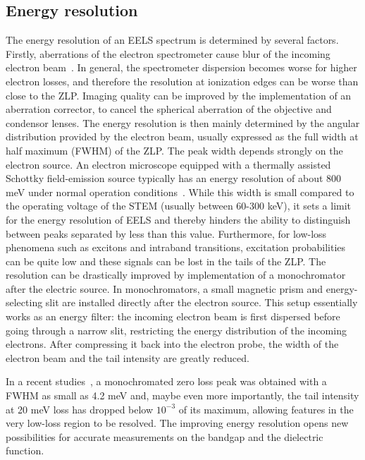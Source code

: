 \subsection{Energy resolution}
The energy resolution of an EELS spectrum is determined by several factors. 
%
Firstly, aberrations of the electron spectrometer cause blur of the incoming 
electron beam~\cite{Tiemeijer}. 
%
In general, the spectrometer dispersion becomes worse for higher electron losses,
and therefore the resolution at ionization edges can be worse than close to the
ZLP.
%
Imaging quality can be improved by the implementation of an aberration corrector, 
to cancel the spherical aberration of the objective and condensor lenses. 
%
The energy resolution is then mainly determined by the angular distribution 
provided by the electron beam, usually expressed as the full width at half maximum (FWHM) of the ZLP. 
%
The peak width depends strongly on the electron source. 
An  electron  microscope  equipped  with  a  thermally  assisted  
Schottky  field-emission source typically has an energy resolution of about 800 meV 
under normal operation conditions~\cite{gu}.  
%
While this width is small compared to the operating voltage of the STEM (usually between 60-300 keV), 
it sets a limit for the energy resolution of EELS and thereby hinders the ability to distinguish 
between peaks separated by less than this value. 
%
Furthermore, for low-loss phenomena such as excitons and intraband transitions, 
excitation probabilities can be quite low and these signals can be lost in the tails of the ZLP.
%
The resolution can be drastically improved by implementation of a monochromator 
after the electric source. 
%
In monochromators, a small magnetic prism and energy-selecting slit are installed 
directly after the electron source.
%
This setup essentially works as an energy filter: the incoming electron beam is first dispersed 
before going through a narrow slit, restricting the energy distribution of the incoming electrons. 
%
After compressing it back into the electron probe, the width of the electron beam 
and the tail intensity are greatly reduced.  
%

In a recent studies~\cite{krivanek}, a monochromated zero loss peak was obtained 
with a FWHM as small as 4.2 meV and, maybe even more importantly, 
the tail intensity at 20 meV loss has dropped below $10^{-3}$ of its maximum, 
allowing features in the very low-loss region to be resolved. 
%
The improving energy resolution opens new possibilities for accurate measurements
on the bandgap and the 
dielectric function.\\

